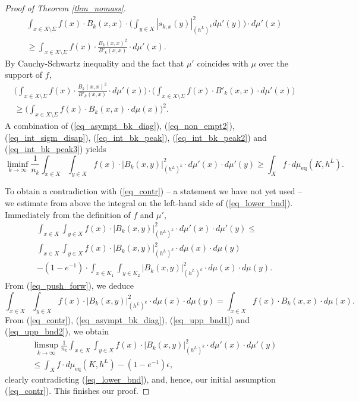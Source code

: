 \documentclass[12pt]{article}
\numberwithin{equation}{section}
\theoremstyle{theorem}
\theoremstyle{definition}
\theoremstyle{remark}
\begin{document}
\begin{proof}[Proof of Theorem \ref{thm_nomass}]
\begin{multline}
			\int_{x \in X \setminus \Sigma} f(x) \cdot B_k(x, x) \cdot \Big( \int_{y \in X} |s_{k, x}(y)|^2_{(h^L)^k} d \mu'(y) \Big) \cdot d \mu'(x)
			\\
			\geq
			\int_{x \in X \setminus \Sigma} f(x) \cdot \frac{B_k(x, x)^2}{B'_k(x, x)} \cdot d \mu'(x).
		\end{multline}
		By Cauchy-Schwartz inequality and the fact that $\mu'$ coincides with $\mu$ over the support of $f$,
		\begin{multline}\label{eq_int_bk_peak3}
			\Big( \int_{x \in X \setminus \Sigma} f(x) \cdot \frac{B_k(x, x)^2}{B'_k(x, x)} \cdot d \mu'(x) \Big)
			\cdot
			\Big(
			\int_{x \in X \setminus \Sigma} f(x) \cdot B'_k(x, x) \cdot d \mu'(x)
			\Big)
			\\
			\geq
			\Big( \int_{x \in X \setminus \Sigma} f(x) \cdot B_k(x, x) \cdot d \mu(x) \Big)^2.
		\end{multline}
		A combination of (\ref{eq_asympt_bk_diag}), (\ref{eq_non_empt2}), (\ref{eq_int_sigm_disap}), (\ref{eq_int_bk_peak}), (\ref{eq_int_bk_peak2}) and (\ref{eq_int_bk_peak3}) yields
		\begin{equation}\label{eq_lower_bnd}
			\liminf_{k \to \infty}
			\frac{1}{n_k}
			\int_{x \in X} \int_{y \in X} f(x) \cdot |B_k(x, y)|^{2}_{(h^L)^k} \cdot d \mu'(x) \cdot d \mu'(y)
			\geq
			\int_{X} f \cdot d \mu_{\mathrm{eq}}(K, h^L).
		\end{equation}
		\par 
		To obtain a contradiction with (\ref{eq_contr}) -- a statement we have not yet used -- we estimate from above the integral on the left-hand side of (\ref{eq_lower_bnd}).
		Immediately from the definition of $f$ and $\mu'$,
		\begin{multline}\label{eq_upp_bnd1}
			\int_{x \in X} \int_{y \in X} f(x) \cdot |B_k(x, y)|^{2}_{(h^L)^k} \cdot d \mu'(x) \cdot d \mu'(y)
			\leq
			\\
			\int_{x \in X} \int_{y \in X} f(x) \cdot |B_k(x, y)|^{2}_{(h^L)^k} \cdot d \mu(x) \cdot d \mu(y)
			\\
			-
			(1 - e^{-1}) \cdot \int_{x \in K_1} \int_{y \in K_2} |B_k(x, y)|^{2}_{(h^L)^k} \cdot d \mu(x) \cdot d \mu(y).
		\end{multline}
		From (\ref{eq_push_forw}), we deduce
		\begin{equation}\label{eq_upp_bnd2}
			\int_{x \in X} \int_{y \in X} f(x) \cdot |B_k(x, y)|^{2}_{(h^L)^k} \cdot d \mu(x) \cdot d \mu(y)
			=
			\int_{x \in X} f(x) \cdot B_k(x, x) \cdot d \mu(x).
		\end{equation}
		From (\ref{eq_contr}), (\ref{eq_asympt_bk_diag}), (\ref{eq_upp_bnd1}) and  (\ref{eq_upp_bnd2}), we obtain
		\begin{multline}
			\limsup_{k \to \infty}
			\frac{1}{n_k}
			\int_{x \in X} \int_{y \in X} f(x) \cdot |B_k(x, y)|^{2}_{(h^L)^k} \cdot d \mu'(x) \cdot d \mu'(y)
			\\
			\leq
			\int_{X} f \cdot d \mu_{\mathrm{eq}}(K, h^L) - (1 - e^{-1}) \epsilon,
		\end{multline}
		clearly contradicting (\ref{eq_lower_bnd}), and, hence, our initial assumption (\ref{eq_contr}).
		This finishes our proof.
	\end{proof}
	
\end{document}
